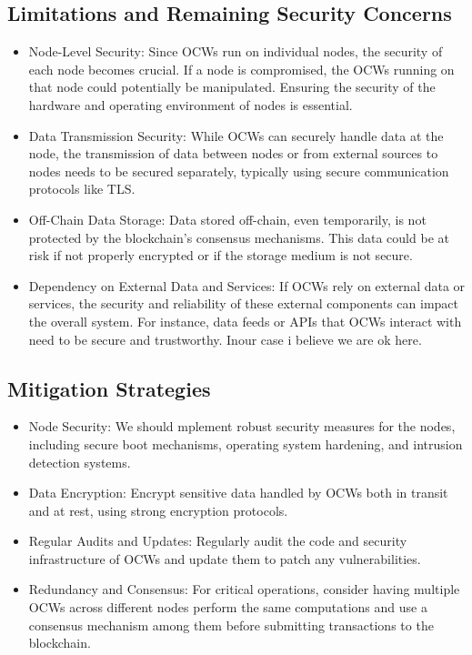 \documentclass{tufte-handout}
\begin{document}
\subsection{Limitations and Remaining Security Concerns}\label{sec:headings}
\begin{itemize}
\item Node-Level Security: Since OCWs run on individual nodes, the security of each node becomes crucial. If a node is compromised, the OCWs running on that node
could potentially be manipulated. Ensuring the security of the hardware and operating environment of nodes is essential.
\item Data Transmission Security: While OCWs can securely handle data at the node, the transmission of data between nodes or from external sources to nodes needs to be
secured separately, typically using secure communication protocols like TLS.
\item Off-Chain Data Storage: Data stored off-chain, even temporarily, is not protected by the blockchain's consensus mechanisms. This data could be at risk if not
properly encrypted or if the storage medium is not secure.
\item Dependency on External Data and Services: If OCWs rely on external data or services, the security and reliability of these external components can impact the
overall system. For instance, data feeds or APIs that OCWs interact with need to be secure and trustworthy. Inour case i believe we are ok here.
\end{itemize}
\subsection{Mitigation Strategies}\label{sec:headings}
\begin{itemize}
    \item Node Security: We should mplement robust security measures for the nodes, including secure boot mechanisms, operating system hardening, and intrusion detection systems.
    \item Data Encryption: Encrypt sensitive data handled by OCWs both in transit and at rest, using strong encryption protocols.
    \item Regular Audits and Updates: Regularly audit the code and security infrastructure of OCWs and update them to patch any vulnerabilities.
    \item Redundancy and Consensus: For critical operations, consider having multiple OCWs across different nodes perform the same computations and use a consensus
    mechanism among them before submitting transactions to the blockchain.
\end{itemize}
\end{document}
